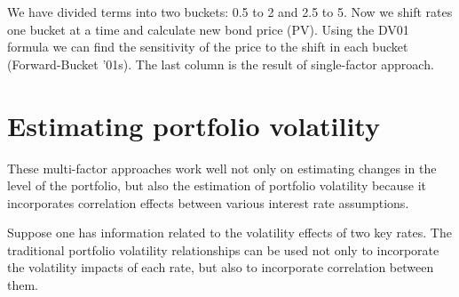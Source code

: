 \documentclass{article}
\begin{document}
We have divided terms into two buckets: 0.5 to 2 and 2.5 to 5. Now we shift rates one bucket at a time and calculate new bond price (PV). Using the DV01 formula we can find the sensitivity of the price to the shift in each bucket (Forward-Bucket '01s). The last column is the result of single-factor approach.

\section{Estimating portfolio volatility}

These multi-factor approaches work well not only on estimating changes in the level of the portfolio, but also the estimation of portfolio volatility because it incorporates correlation effects between various interest rate assumptions.

Suppose one has information related to the volatility effects of two key rates. The traditional portfolio volatility relationships can be used not only to incorporate the volatility impacts of each rate, but also to incorporate correlation between them.
\end{document}
